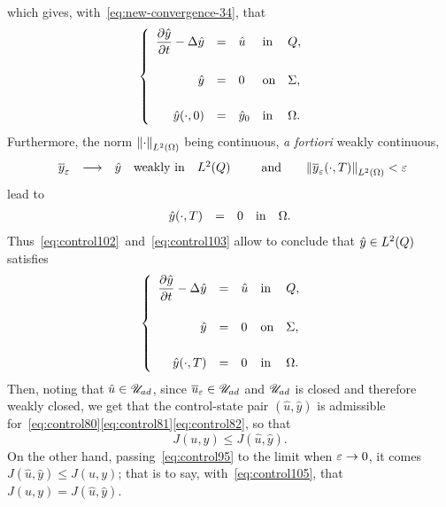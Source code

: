 which gives, with~\eqref{eq:new-convergence-34}, that
\begin{equation}\label{eq:control102}
    \begin{cases}\displaystyle
        \begin{array}{rclll}
            \dfrac{\partial{}\hat{y}}{\partial{}t} - \Delta\hat{y} & = & \hat{u} &
            \text{in} & Q,\\
            \\
            \hat{y} & = & 0 & \text{on} & \Sigma,\\
            \\
            {\hat{y}}\!\left({\cdot, 0}\right) & = & {\hat{y}}_{0} & \text{in} &
            \Omega.
        \end{array}
    \end{cases}
\end{equation}
Furthermore, the norm ${\left\|{\cdot }\right\|}_{L^{2}\left({\Omega}\right)}$ being continuous, \textit{a fortiori}
weakly continuous,
\begin{equation*}
    \begin{array}{rclll}
        {\overline{y}}_{\varepsilon} & \longrightarrow & \hat{y} & \text{weakly in} &
        L^{2}\!\left({Q}\right)
    \end{array}\qquad\text{and}\qquad
    {\left\|{ { {\overline{y}}_{\varepsilon} }\!\left({\cdot,T}\right)  }\right\|}_{L^{2}\left({\Omega}\right)} < \varepsilon
\end{equation*}
lead to
\begin{equation}\label{eq:control103}
    \begin{array}{rclll}
        {\hat{y}}\!\left({\cdot,T}\right) & = & 0 & \text{in} & \Omega.
    \end{array}
\end{equation}
Thus~\eqref{eq:control102}~and~\eqref{eq:control103} allow to conclude that
$\hat{y}\in L^{2}\!\left({Q}\right)$ satisfies
\begin{equation*}
    \begin{cases}\displaystyle
        \begin{array}{rclll}
            \dfrac{\partial{}\hat{y}}{\partial{}t} - \Delta\hat{y} & = & \hat{u} &
            \text{in} & Q,\\
            \\
            \hat{y} & = & 0 & \text{on} & \Sigma,\\
            \\
            {\hat{y}}\!\left({\cdot,T}\right) & = & 0 & \text{in} & \Omega.
        \end{array}
    \end{cases}
\end{equation*}
Then, noting that $\hat{u}\in{\mathscr{U}}_{ad}$, since ${\overline{u}}_{\varepsilon}\in{\mathscr{U}}_{ad}$ and ${\mathscr{U}}_{ad}$ is
closed and therefore weakly closed, we get that the control-state pair
$\left({\hat{u},\hat{y}}\right)$ is admissible
for~\eqref{eq:control80}\eqref{eq:control81}\eqref{eq:control82}, so that
\begin{equation}\label{eq:control105}
    J(u,y)\leq J\!\left({\hat{u},\hat{y}}\right).
\end{equation}
On the other hand, passing~\eqref{eq:control95} to the limit when $\varepsilon\to
0$, it comes $J\!\left({\hat{u},\hat{y}}\right)\leq J(u,y)$; that is to
say, with~\eqref{eq:control105}, that $J(u,y) =
J\!\left({\hat{u},\hat{y}}\right)$.

